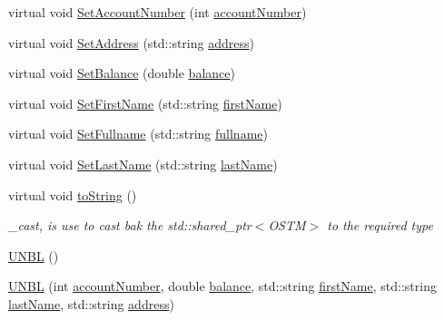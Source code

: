 \begin{DoxyCompactItemize}
\item 
virtual void \hyperlink{class_u_n_b_l_a0ee536d872c0f93486f942b268c2431e_a0ee536d872c0f93486f942b268c2431e}{Set\+Account\+Number} (int \hyperlink{class_u_n_b_l_a90763c3044159862bcb9cd51d6b09f34_a90763c3044159862bcb9cd51d6b09f34}{account\+Number})
\item 
virtual void \hyperlink{class_u_n_b_l_acbd63767c5070d82605671cfce0433a9_acbd63767c5070d82605671cfce0433a9}{Set\+Address} (std\+::string \hyperlink{class_u_n_b_l_acdaf39211e9b9c190a69bbbc590543e3_acdaf39211e9b9c190a69bbbc590543e3}{address})
\item 
virtual void \hyperlink{class_u_n_b_l_a3b7b2089cf4e2995e99b860b1fb2e5cb_a3b7b2089cf4e2995e99b860b1fb2e5cb}{Set\+Balance} (double \hyperlink{class_u_n_b_l_afbe674996d7fddaffb55654e6a79f03b_afbe674996d7fddaffb55654e6a79f03b}{balance})
\item 
virtual void \hyperlink{class_u_n_b_l_aef061d2cba01bcd752e9305dc374cabc_aef061d2cba01bcd752e9305dc374cabc}{Set\+First\+Name} (std\+::string \hyperlink{class_u_n_b_l_acee1595bf1914ac220f7c810b174bd16_acee1595bf1914ac220f7c810b174bd16}{first\+Name})
\item 
virtual void \hyperlink{class_u_n_b_l_a1b3f52c44756930c1ee4acb06f2634ad_a1b3f52c44756930c1ee4acb06f2634ad}{Set\+Fullname} (std\+::string \hyperlink{class_u_n_b_l_a67deb62f553fe1ece6feb73f12898e7a_a67deb62f553fe1ece6feb73f12898e7a}{fullname})
\item 
virtual void \hyperlink{class_u_n_b_l_abd683db339dffe71af3993a8a5cb5929_abd683db339dffe71af3993a8a5cb5929}{Set\+Last\+Name} (std\+::string \hyperlink{class_u_n_b_l_a3f42790177cbe310536f53a7369ee194_a3f42790177cbe310536f53a7369ee194}{last\+Name})
\item 
virtual void \hyperlink{class_u_n_b_l_a76d8bba21d64d79d8de63763b8acc1fd_a76d8bba21d64d79d8de63763b8acc1fd}{to\+String} ()
\begin{DoxyCompactList}\small\item\em \+\_\+cast, is use to cast bak the std\+::shared\+\_\+ptr$<$\+O\+S\+T\+M$>$ to the required type \end{DoxyCompactList}\item 
\hyperlink{class_u_n_b_l_aa264ef64c453e6049b3d4c984d84d1de_aa264ef64c453e6049b3d4c984d84d1de}{U\+N\+BL} ()
\item 
\hyperlink{class_u_n_b_l_a9afc7728e8d9970b63592af018a2afb8_a9afc7728e8d9970b63592af018a2afb8}{U\+N\+BL} (int \hyperlink{class_u_n_b_l_a90763c3044159862bcb9cd51d6b09f34_a90763c3044159862bcb9cd51d6b09f34}{account\+Number}, double \hyperlink{class_u_n_b_l_afbe674996d7fddaffb55654e6a79f03b_afbe674996d7fddaffb55654e6a79f03b}{balance}, std\+::string \hyperlink{class_u_n_b_l_acee1595bf1914ac220f7c810b174bd16_acee1595bf1914ac220f7c810b174bd16}{first\+Name}, std\+::string \hyperlink{class_u_n_b_l_a3f42790177cbe310536f53a7369ee194_a3f42790177cbe310536f53a7369ee194}{last\+Name}, std\+::string \hyperlink{class_u_n_b_l_acdaf39211e9b9c190a69bbbc590543e3_acdaf39211e9b9c190a69bbbc590543e3}{address})

\end{DoxyCompactItemize}
